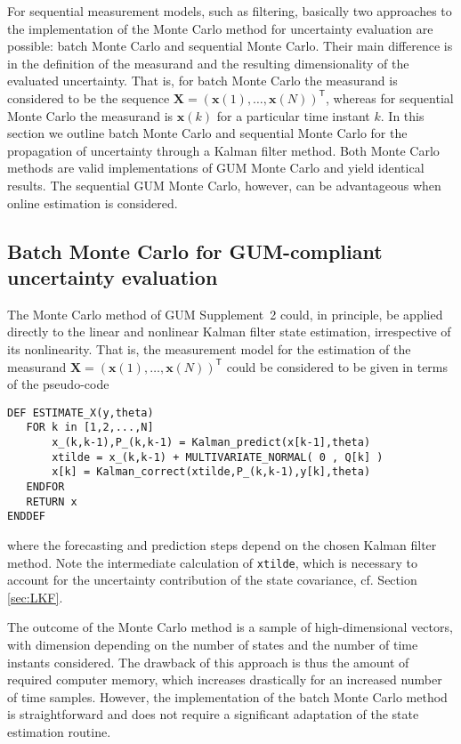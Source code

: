 \documentclass[10pt]{article}
\begin{document}
\begin{spacing}{1}
For sequential measurement models, such as filtering, basically two approaches to the implementation of the Monte Carlo method for uncertainty evaluation are possible: batch Monte Carlo and sequential Monte Carlo. Their main difference is in the definition of the measurand and the resulting dimensionality of the evaluated uncertainty. That is, for batch Monte Carlo the measurand is considered to be the sequence $\bm{X}=\left( \bm{x}(1),\ldots,\bm{x}(N) \right)^{\mathsf{T}}$, whereas for sequential Monte Carlo the measurand is $\bm{x}(k)$ for a particular time instant $k$. In this section we outline batch Monte Carlo and sequential Monte Carlo for the propagation of uncertainty through a Kalman filter method. Both Monte Carlo methods are valid implementations of GUM Monte Carlo and yield identical results. The sequential GUM Monte Carlo, however, can be advantageous when online estimation is considered.


\subsection{Batch Monte Carlo for GUM-compliant uncertainty evaluation}
\label{sec:batchMC}
The Monte Carlo method of GUM Supplement~2 \cite{GUMS2} could, in principle, be applied directly to the linear and nonlinear Kalman filter state estimation, irrespective of its nonlinearity. That is, the measurement model for the estimation of the measurand $\bm{X}=\left( \bm{x}(1),\ldots,\bm{x}(N) \right)^{\mathsf{T}}$ could be considered to be given in terms of the pseudo-code
\begin{verbatim}
DEF ESTIMATE_X(y,theta)
   FOR k in [1,2,...,N]
       x_(k,k-1),P_(k,k-1) = Kalman_predict(x[k-1],theta)
       xtilde = x_(k,k-1) + MULTIVARIATE_NORMAL( 0 , Q[k] )
       x[k] = Kalman_correct(xtilde,P_(k,k-1),y[k],theta)
   ENDFOR
   RETURN x
ENDDEF
\end{verbatim}
where the forecasting and prediction steps depend on the chosen Kalman filter method. Note the intermediate calculation of \verb!xtilde!, which is necessary to account for the uncertainty contribution of the state covariance, cf. Section \ref{sec:LKF}. 

The outcome of the Monte Carlo method is a sample of high-dimensional vectors, with dimension depending on the number of states and the number of time instants considered. The drawback of this approach is thus the amount of required computer memory, which increases drastically for an increased number of time samples. However, the implementation of the batch Monte Carlo method is straightforward and does not require a significant adaptation of the state estimation routine. 


\end{spacing}
\end{document}
